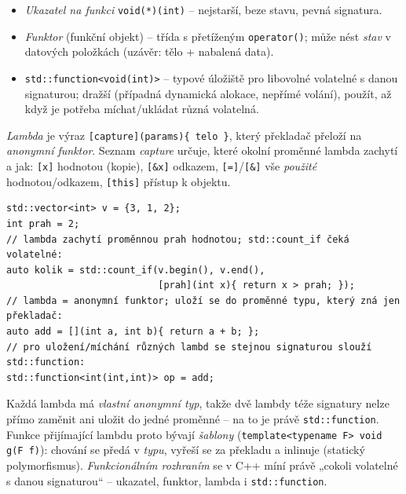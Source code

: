 \documentclass[11pt,a4paper]{article}
\newcommand{\cd}{\lstinline[style=cpp]}
\begin{document}
\begin{definice}
\begin{itemize}
  \item \emph{Ukazatel na funkci} \cd{void(*)(int)} -- nejstarší, beze stavu, pevná signatura.
  \item \emph{Funktor} (funkční objekt) -- třída s přetíženým \cd{operator()}; může nést \emph{stav} v datových položkách (uzávěr: tělo + nabalená data).
  \item \cd{std::function<void(int)>} -- typové úložiště pro libovolné volatelné s danou signaturou; dražší (případná dynamická alokace, nepřímé volání), použít, až když je potřeba míchat/ukládat různá volatelná.
\end{itemize}
\end{definice}

\begin{definice}
\emph{Lambda} je výraz \lstinline[style=cpp]![capture](params){ telo }!, který překladač přeloží na \emph{anonymní funktor}. Seznam \emph{capture} určuje, které okolní proměnné lambda zachytí a jak: \cd{[x]} hodnotou (kopie), \cd{[&x]} odkazem, \cd{[=]}/\cd{[&]} vše \emph{použité} hodnotou/odkazem, \cd{[this]} přístup k objektu.
\end{definice}

\begin{lstlisting}[style=cpp]
std::vector<int> v = {3, 1, 2};
int prah = 2;
// lambda zachytí proměnnou prah hodnotou; std::count_if čeká volatelné:
auto kolik = std::count_if(v.begin(), v.end(),
                           [prah](int x){ return x > prah; });
// lambda = anonymní funktor; uloží se do proměnné typu, který zná jen překladač:
auto add = [](int a, int b){ return a + b; };
// pro uložení/míchání různých lambd se stejnou signaturou slouží std::function:
std::function<int(int,int)> op = add;
\end{lstlisting}

\begin{intuice}
Každá lambda má \emph{vlastní anonymní typ}, takže dvě lambdy téže signatury nelze přímo zaměnit ani uložit do jedné proměnné -- na to je právě \cd{std::function}. Funkce přijímající lambdu proto bývají \emph{šablony} (\cd{template<typename F> void g(F f)}): chování se předá v \emph{typu}, vyřeší se za překladu a inlinuje (statický polymorfismus). \emph{Funkcionálním rozhraním} se v C++ míní právě „cokoli volatelné s danou signaturou`` -- ukazatel, funktor, lambda i \cd{std::function}.
\end{intuice}
\end{document}
